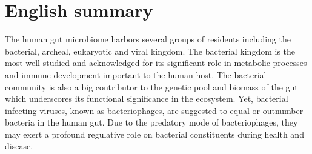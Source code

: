 \chapter{English summary}

The human gut microbiome harbors several groups of residents including the bacterial, archeal, eukaryotic and viral kingdom. The bacterial kingdom is the most well studied and acknowledged for its significant role in metabolic processes and immune development important to the human host. The bacterial community is also a big contributor to the genetic pool and biomass of the gut which underscores its functional significance in the ecosystem. Yet, bacterial infecting viruses, known as bacteriophages, are suggested to equal or outnumber bacteria in the human gut. Due to the predatory mode of bacteriophages, they may exert a profound regulative role on bacterial constituents during health and disease.

